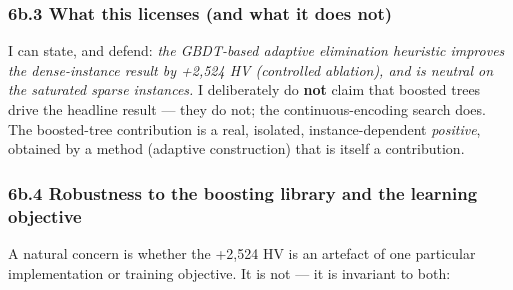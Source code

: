 \documentclass[
  11pt,
]{article}
\begin{document}
\hypertarget{b.3-what-this-licenses-and-what-it-does-not}{%
\subsubsection{6b.3 What this licenses (and what it does
not)}\label{b.3-what-this-licenses-and-what-it-does-not}}

I can state, and defend: \emph{the GBDT-based adaptive elimination
heuristic improves the dense-instance result by +2,524 HV (controlled
ablation), and is neutral on the saturated sparse instances.} I
deliberately do \textbf{not} claim that boosted trees drive the headline
result --- they do not; the continuous-encoding search does. The
boosted-tree contribution is a real, isolated, instance-dependent
\emph{positive}, obtained by a method (adaptive construction) that is
itself a contribution.

\hypertarget{b.4-robustness-to-the-boosting-library-and-the-learning-objective}{%
\subsubsection{6b.4 Robustness to the boosting library and the learning
objective}\label{b.4-robustness-to-the-boosting-library-and-the-learning-objective}}

A natural concern is whether the +2,524 HV is an artefact of one
particular implementation or training objective. It is not --- it is
invariant to both:
\end{document}
